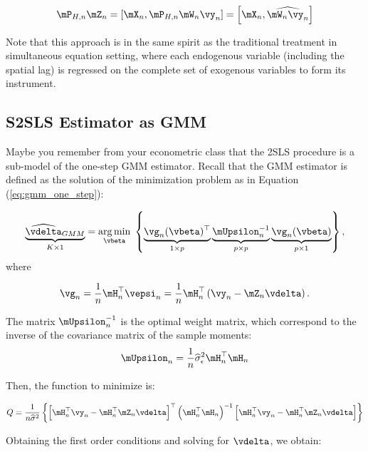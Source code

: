 \documentclass[english,12pt]{book}\usepackage[]{graphicx}\usepackage[]{xcolor}
\begin{document}
\begin{equation}
  \mP_{H, n}\mZ_n = \left[\mX_n, \mP_{H, n}\mW_n\vy_n\right] = \left[\mX_n, \widehat{\mW_n\vy_n}\right]
\end{equation}

Note that this approach is in the same spirit as the traditional treatment in simultaneous equation setting, where each endogenous variable (including the spatial lag) is regressed on the complete set of exogenous variables to form its instrument. 


\subsection{S2SLS Estimator as GMM}

Maybe you remember from  your econometric class that the 2SLS procedure is a sub-model of the one-step GMM estimator. Recall that the GMM estimator is defined as the solution of the minimization problem as in Equation (\ref{eq:gmm_one_step}):

\begin{equation*}
	\underbrace{\widehat{\vdelta}_{GMM}}_{K\times 1} = \underset{\vbeta}{\arg\min}\; \left\lbrace \underbrace{\vg_n(\vbeta)^\top}_{1\times p}\underbrace{\mUpsilon_n^{-1}}_{p\times p}\underbrace{\vg_n(\vbeta)}_{p\times 1}\right\rbrace,
\end{equation*}
%
where 

\begin{equation*}
\vg_n = \frac{1}{n}\mH^\top_n\vepsi_n= \frac{1}{n}\mH^\top_n\left(\vy_n - \mZ_n\vdelta\right).
\end{equation*}

The matrix $\mUpsilon_n^{-1}$ is the optimal weight matrix, which correspond to the inverse of the covariance matrix of the sample moments: 
\begin{equation*}
	\mUpsilon_n = \frac{1}{n}\widehat{\sigma}^2_{\epsilon}\mH^\top_n\mH_n
\end{equation*}

Then, the function to minimize is:

\begin{equation*}
		Q  = \frac{1}{n\widehat{\sigma}^2}\left\lbrace \left[\mH^\top_n\vy_n - \mH^\top_n\mZ_n\vdelta\right]^\top\left(\mH^\top_n\mH_n\right)^{-1}\left[\mH^\top_n\vy_n - \mH^\top_n\mZ_n\vdelta\right]\right\rbrace 
\end{equation*}

Obtaining the first order conditions and solving for $\vdelta$, we obtain:
\end{document}
